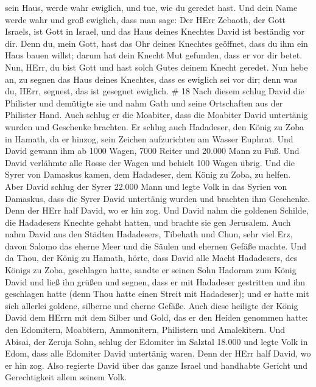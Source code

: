 sein Haus, werde wahr ewiglich, und tue, wie du geredet hast.
 Und dein Name werde wahr und groß ewiglich, dass man sage:
Der HErr Zebaoth, der Gott Israels, ist Gott in Israel, und das Haus
deines Knechtes David ist beständig vor dir.  Denn du, mein
Gott, hast das Ohr deines Knechtes geöffnet, dass du ihm ein Haus bauen
willst; darum hat dein Knecht Mut gefunden, dass er vor dir betet.
 Nun, HErr, du bist Gott und hast solch Gutes deinem Knecht
geredet.  Nun hebe an, zu segnen das Haus deines Knechtes,
dass es ewiglich sei vor dir; denn was du, HErr, segnest, das ist
gesegnet ewiglich. \# 18  Nach diesem schlug David die
Philister und demütigte sie und nahm Gath und seine Ortschaften aus der
Philister Hand.  Auch schlug er die Moabiter, dass die
Moabiter David untertänig wurden und Geschenke brachten.  Er
schlug auch Hadadeser, den König zu Zoba in Hamath, da er hinzog, sein
Zeichen aufzurichten am Wasser Euphrat.  Und David gewann
ihm ab 1000 Wagen, 7000 Reiter und 20.000 Mann zu Fuß. Und David
verlähmte alle Rosse der Wagen und behielt 100 Wagen übrig. 
Und die Syrer von Damaskus kamen, dem Hadadeser, dem König zu Zoba, zu
helfen. Aber David schlug der Syrer 22.000 Mann  und legte
Volk in das Syrien von Damaskus, dass die Syrer David untertänig wurden
und brachten ihm Geschenke. Denn der HErr half David, wo er hin zog.
 Und David nahm die goldenen Schilde, die Hadadesers Knechte
gehabt hatten, und brachte sie gen Jerusalem.  Auch nahm
David aus den Städten Hadadesers, Tibehath und Chun, sehr viel Erz,
davon Salomo das eherne Meer und die Säulen und ehernen Gefäße machte.
 Und da Thou, der König zu Hamath, hörte, dass David alle
Macht Hadadesers, des Königs zu Zoba, geschlagen hatte, 
sandte er seinen Sohn Hadoram zum König David und ließ ihn grüßen und
segnen, dass er mit Hadadeser gestritten und ihn geschlagen hatte (denn
Thou hatte einen Streit mit Hadadeser); und er hatte mit sich allerlei
goldene, silberne und eherne Gefäße.  Auch diese heiligte
der König David dem HErrn mit dem Silber und Gold, das er den Heiden
genommen hatte: den Edomitern, Moabitern, Ammonitern, Philistern und
Amalekitern.  Und Abisai, der Zeruja Sohn, schlug der
Edomiter im Salztal 18.000  und legte Volk in Edom, dass
alle Edomiter David untertänig waren. Denn der HErr half David, wo er
hin zog.  Also regierte David über das ganze Israel und
handhabte Gericht und Gerechtigkeit allem seinem Volk. 
